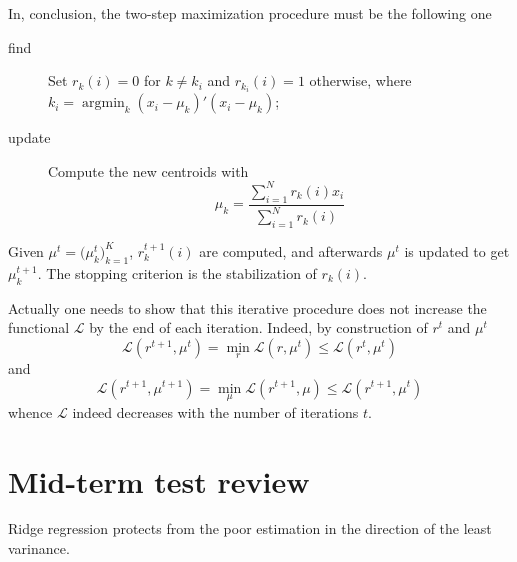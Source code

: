 \documentclass[a4paper]{article}
\newcommand{\Lcal}{\mathcal{L}}
\newcommand{\argmin}{\mathop{\text{argmin}}}
\begin{document}
In, conclusion, the two-step maximization procedure must be the following one \begin{description}
	\item[find] Set $r_k(i)=0$ for $k\neq k_i$ and $r_{k_i}(i)=1$ otherwise, where
	$k_i = \argmin_k (x_i-\mu_k)'(x_i-\mu_k)$;
	\item[update] Compute the new centroids with
	\[\mu_k = \frac{\sum_{i=1}^N r_k(i) x_i}{\sum_{i=1}^N r_k(i)}\]
\end{description}
Given $\mu^t = \bigl(\mu_k^t\bigr)_{k=1}^K$, $r_k^{t+1}(i)$ are computed,
and afterwards $\mu^t$ is updated to get $\mu_k^{t+1}$. The stopping criterion
is the stabilization of $r_k(i)$.

Actually one needs to show that this iterative procedure does not increase
the functional $\Lcal$ by the end of each iteration. Indeed, by construction
of $r^t$ and $\mu^t$
\[\Lcal(r^{t+1}, \mu^t) = \min_r \Lcal(r, \mu^t) \leq \Lcal(r^t, \mu^t)\]
and
\[\Lcal(r^{t+1}, \mu^{t+1}) = \min_\mu \Lcal(r^{t+1}, \mu) \leq \Lcal(r^{t+1}, \mu^t)\]
whence $\Lcal$ indeed decreases with the number of iterations $t$.




\clearpage
\section*{Mid-term test review} %
\label{sec:mid_term_test_review}
Ridge regression protects from the poor estimation in the direction of the least varinance.
\end{document}
